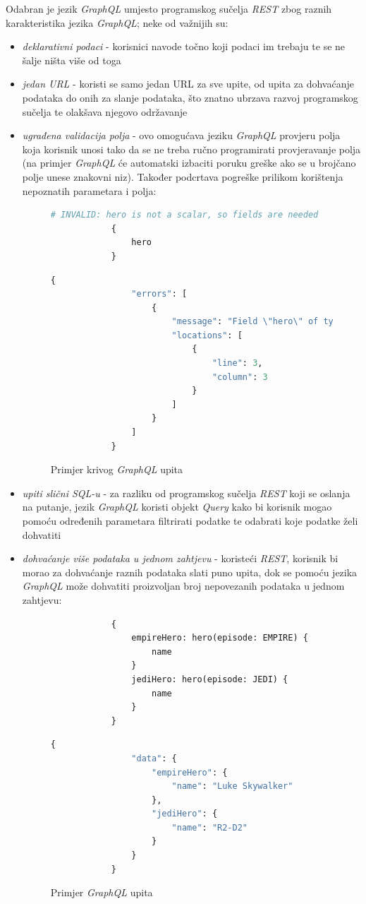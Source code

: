 \documentclass[zavrsnirad]{fer}
\begin{document}
Odabran je jezik \textit{GraphQL} umjesto programskog sučelja \textit{REST} zbog raznih karakteristika jezika \textit{GraphQL}; neke od važnijih su:
 \begin{itemize}
 	\item \textit{deklarativni podaci} - korisnici navode točno koji podaci im trebaju te se ne šalje ništa više od toga
 	\item \textit{jedan URL} - koristi se samo jedan URL za sve upite, od upita za dohvaćanje podataka do onih za slanje podataka, što znatno ubrzava razvoj programskog sučelja te olakšava njegovo održavanje
 	\item \textit{ugrađena validacija polja} - ovo omogućava jeziku \textit{GraphQL} provjeru polja koja korisnik unosi tako da se ne treba ručno programirati provjeravanje polja (na primjer \textit{GraphQL} će automatski izbaciti poruku greške ako se u brojčano polje unese znakovni niz). Također podcrtava pogreške prilikom korištenja nepoznatih parametara i polja:

	\begin{figure}[htb]
		\centering
		 	\begin{lstlisting}[language=GraphQL]
			# INVALID: hero is not a scalar, so fields are needed
			{
				hero
			}
		\end{lstlisting}
		\begin{lstlisting}[language=GraphQL]
			{
				"errors": [
					{
						"message": "Field \"hero\" of type \"Character\" must have a selection of subfields. Did you mean \"hero { ... }\"?",
						"locations": [
							{
								"line": 3,
								"column": 3
							}
						]
					}
				]
			}
		\end{lstlisting}
		\caption{Primjer krivog \textit{GraphQL} upita \cite{graphql_validation}}
	\end{figure}
	\FloatBarrier

 	\item \textit{upiti slični SQL-u} - za razliku od programskog sučelja \textit{REST} koji se oslanja na putanje, jezik \textit{GraphQL} koristi objekt \textit{Query} kako bi korisnik mogao pomoću određenih parametara filtrirati podatke te odabrati koje podatke želi dohvatiti
 	\item \textit{dohvaćanje više podataka u jednom zahtjevu} - koristeći \textit{REST}, korisnik bi morao za dohvaćanje raznih podataka slati puno upita, dok se pomoću jezika \textit{GraphQL} može dohvatiti proizvoljan broj nepovezanih podataka u jednom zahtjevu:

 	\begin{figure}[htb]
 		\centering
 		 	\begin{lstlisting}
 			{
 				empireHero: hero(episode: EMPIRE) {
 					name
 				}
 				jediHero: hero(episode: JEDI) {
 					name
 				}
 			}
 		\end{lstlisting}
 		\begin{lstlisting}[language=GraphQL]
 			{
 				"data": {
 					"empireHero": {
 						"name": "Luke Skywalker"
 					},
 					"jediHero": {
 						"name": "R2-D2"
 					}
 				}
 			}
 		\end{lstlisting}
 		\caption{Primjer \textit{GraphQL} upita \cite{graphql_query}}
 	\end{figure}
 	\FloatBarrier
 	

\end{itemize}
\end{document}

